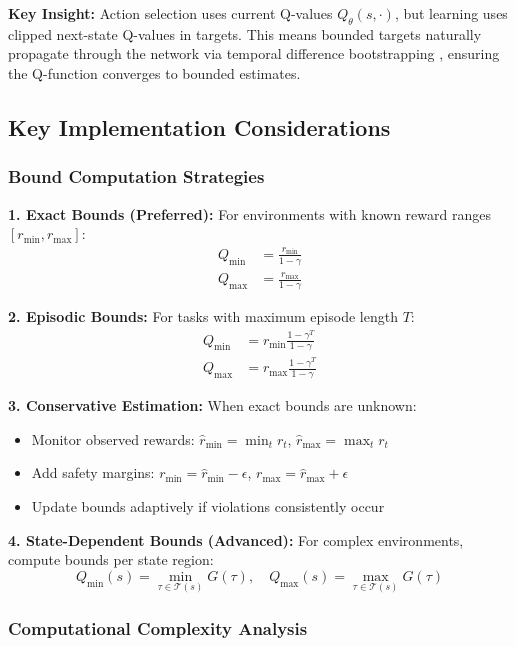 \documentclass[11pt]{article}
\theoremstyle{definition}
\theoremstyle{remark}
\begin{document}
\textbf{Key Insight:} Action selection uses current Q-values $Q_\theta(s, \cdot)$, but learning uses clipped next-state Q-values in targets. This means bounded targets naturally propagate through the network via temporal difference bootstrapping \citep{sutton2018reinforcement}, ensuring the Q-function converges to bounded estimates.

\subsection{Key Implementation Considerations}

\subsubsection{Bound Computation Strategies}

\textbf{1. Exact Bounds (Preferred):}
For environments with known reward ranges $[r_{\min}, r_{\max}]$:
\begin{align}
Q_{\min} &= \frac{r_{\min}}{1-\gamma} \\
Q_{\max} &= \frac{r_{\max}}{1-\gamma}
\end{align}

\textbf{2. Episodic Bounds:}
For tasks with maximum episode length $T$:
\begin{align}
Q_{\min} &= r_{\min} \frac{1-\gamma^T}{1-\gamma} \\
Q_{\max} &= r_{\max} \frac{1-\gamma^T}{1-\gamma}
\end{align}

\textbf{3. Conservative Estimation:}
When exact bounds are unknown:
\begin{itemize}
    \item Monitor observed rewards: $\hat{r}_{\min} = \min_t r_t$, $\hat{r}_{\max} = \max_t r_t$
    \item Add safety margins: $r_{\min} = \hat{r}_{\min} - \epsilon$, $r_{\max} = \hat{r}_{\max} + \epsilon$
    \item Update bounds adaptively if violations consistently occur
\end{itemize}

\textbf{4. State-Dependent Bounds (Advanced):}
For complex environments, compute bounds per state region:
$$Q_{\min}(s) = \min_{\tau \in \mathcal{T}(s)} G(\tau), \quad Q_{\max}(s) = \max_{\tau \in \mathcal{T}(s)} G(\tau)$$

\subsubsection{Computational Complexity Analysis}
\end{document}
